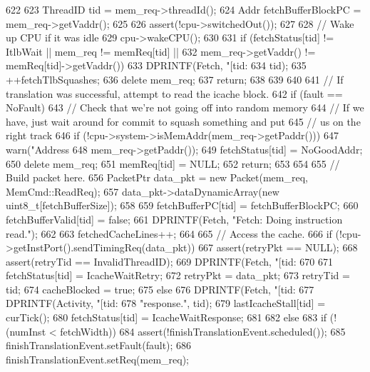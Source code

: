 \begin{DoxyCode}
622 {
623     ThreadID tid = mem_req->threadId();
624     Addr fetchBufferBlockPC = mem_req->getVaddr();
625 
626     assert(!cpu->switchedOut());
627 
628     // Wake up CPU if it was idle
629     cpu->wakeCPU();
630 
631     if (fetchStatus[tid] != ItlbWait || mem_req != memReq[tid] ||
632         mem_req->getVaddr() != memReq[tid]->getVaddr()) {
633         DPRINTF(Fetch, "[tid:%
634                 tid);
635         ++fetchTlbSquashes;
636         delete mem_req;
637         return;
638     }
639 
640 
641     // If translation was successful, attempt to read the icache block.
642     if (fault == NoFault) {
643         // Check that we're not going off into random memory
644         // If we have, just wait around for commit to squash something and put
645         // us on the right track
646         if (!cpu->system->isMemAddr(mem_req->getPaddr())) {
647             warn("Address %
648                     mem_req->getPaddr());
649             fetchStatus[tid] = NoGoodAddr;
650             delete mem_req;
651             memReq[tid] = NULL;
652             return;
653         }
654 
655         // Build packet here.
656         PacketPtr data_pkt = new Packet(mem_req, MemCmd::ReadReq);
657         data_pkt->dataDynamicArray(new uint8_t[fetchBufferSize]);
658 
659         fetchBufferPC[tid] = fetchBufferBlockPC;
660         fetchBufferValid[tid] = false;
661         DPRINTF(Fetch, "Fetch: Doing instruction read.\n");
662 
663         fetchedCacheLines++;
664 
665         // Access the cache.
666         if (!cpu->getInstPort().sendTimingReq(data_pkt)) {
667             assert(retryPkt == NULL);
668             assert(retryTid == InvalidThreadID);
669             DPRINTF(Fetch, "[tid:%
670 
671             fetchStatus[tid] = IcacheWaitRetry;
672             retryPkt = data_pkt;
673             retryTid = tid;
674             cacheBlocked = true;
675         } else {
676             DPRINTF(Fetch, "[tid:%
677             DPRINTF(Activity, "[tid:%
678                     "response.\n", tid);
679             lastIcacheStall[tid] = curTick();
680             fetchStatus[tid] = IcacheWaitResponse;
681         }
682     } else {
683         if (!(numInst < fetchWidth)) {
684             assert(!finishTranslationEvent.scheduled());
685             finishTranslationEvent.setFault(fault);
686             finishTranslationEvent.setReq(mem_req);
}}}
\end{DoxyCode}
